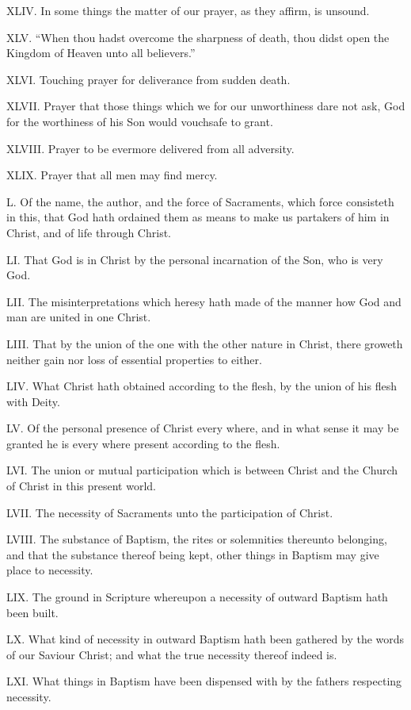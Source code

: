 XLIV. In some things the matter of our prayer, as they affirm, is unsound.

XLV. “When thou hadst overcome the sharpness of death, thou didst open the Kingdom of Heaven unto all believers.”

XLVI. Touching prayer for deliverance from sudden death.

XLVII. Prayer that those things which we for our unworthiness dare not ask, God for the worthiness of his Son would vouchsafe to grant.

XLVIII. Prayer to be evermore delivered from all adversity.

XLIX. Prayer that all men may find mercy.

L. Of the name, the author, and the force of Sacraments, which force consisteth in this, that God hath ordained them as means to make us partakers of him in Christ, and of life through Christ.

LI. That God is in Christ by the personal incarnation of the Son, who is very God.  

LII. The misinterpretations which heresy hath made of the manner how God and man are united in one Christ.

LIII. That by the union of the one with the other nature in Christ, there groweth neither gain nor loss of essential properties to either.

LIV. What Christ hath obtained according to the flesh, by the union of his flesh with Deity.

LV. Of the personal presence of Christ every where, and in what sense it may be granted he is every where present according to the flesh.

LVI. The union or mutual participation which is between Christ and the Church of Christ in this present world.

LVII. The necessity of Sacraments unto the participation of Christ.

LVIII. The substance of Baptism, the rites or solemnities thereunto belonging, and that the substance thereof being kept, other things in Baptism may give place to necessity.

LIX. The ground in Scripture whereupon a necessity of outward Baptism hath been built.

LX. What kind of necessity in outward Baptism hath been gathered by the words of our Saviour Christ; and what the true necessity thereof indeed is.

LXI. What things in Baptism have been dispensed with by the fathers respecting necessity.

